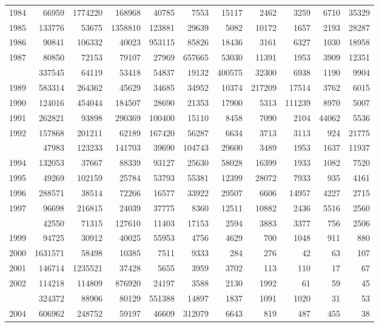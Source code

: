 \documentclass[
]{article}
\begin{document}
\begin{longtable}[t]{lrrrrrrrrrr}
1984 & 66959 & 1774220 & 168968 & 40785 & 7553 & 15117 & 2462 & 3259 & 6710 & 35329\\
1985 & 133776 & 53675 & 1358810 & 123881 & 29639 & 5082 & 10172 & 1657 & 2193 & 28287\\
1986 & 90841 & 106332 & 40023 & 953115 & 85826 & 18436 & 3161 & 6327 & 1030 & 18958\\
1987 & 80850 & 72153 & 79107 & 27969 & 657665 & 53030 & 11391 & 1953 & 3909 & 12351\\
\addlinespace
1988 & 337545 & 64119 & 53418 & 54837 & 19132 & 400575 & 32300 & 6938 & 1190 & 9904\\
1989 & 583314 & 264362 & 45629 & 34685 & 34952 & 10374 & 217209 & 17514 & 3762 & 6015\\
1990 & 124016 & 454044 & 184507 & 28690 & 21353 & 17900 & 5313 & 111239 & 8970 & 5007\\
1991 & 262821 & 93898 & 290369 & 100400 & 15110 & 8458 & 7090 & 2104 & 44062 & 5536\\
1992 & 157868 & 201211 & 62189 & 167420 & 56287 & 6634 & 3713 & 3113 & 924 & 21775\\
\addlinespace
1993 & 47983 & 123233 & 141703 & 39690 & 104743 & 29600 & 3489 & 1953 & 1637 & 11937\\
1994 & 132053 & 37667 & 88339 & 93127 & 25630 & 58028 & 16399 & 1933 & 1082 & 7520\\
1995 & 49269 & 102159 & 25784 & 53793 & 55381 & 12399 & 28072 & 7933 & 935 & 4161\\
1996 & 288571 & 38514 & 72266 & 16577 & 33922 & 29507 & 6606 & 14957 & 4227 & 2715\\
1997 & 96698 & 216815 & 24039 & 37775 & 8360 & 12511 & 10882 & 2436 & 5516 & 2560\\
\addlinespace
1998 & 42550 & 71315 & 127610 & 11403 & 17153 & 2594 & 3883 & 3377 & 756 & 2506\\
1999 & 94725 & 30912 & 40025 & 55953 & 4756 & 4629 & 700 & 1048 & 911 & 880\\
2000 & 1631571 & 58498 & 10385 & 7511 & 9333 & 284 & 276 & 42 & 63 & 107\\
2001 & 146714 & 1235521 & 37428 & 5655 & 3959 & 3702 & 113 & 110 & 17 & 67\\
2002 & 114218 & 114809 & 876920 & 24197 & 3588 & 2130 & 1992 & 61 & 59 & 45\\
\addlinespace
2003 & 324372 & 88906 & 80129 & 551388 & 14897 & 1837 & 1091 & 1020 & 31 & 53\\
2004 & 606962 & 248752 & 59197 & 46609 & 312079 & 6643 & 819 & 487 & 455 & 38\\

\end{longtable}
\end{document}
